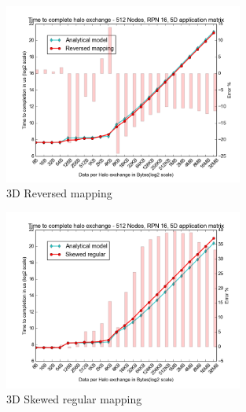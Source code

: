 \documentclass{beamer}
\begin{document}
\begin{frame}
\begin{figure}
\caption{3D Reversed mapping}
  \includegraphics[width=0.7\textwidth]{../mappings/3d_reversed.png}
\end{figure}
\end{frame}

\begin{frame}
\begin{figure}
\caption{3D Skewed regular mapping}
  \includegraphics[width=0.7\textwidth]{../mappings/3d_skewed_regular.png}
\end{figure}
\end{frame}



\end{document}
